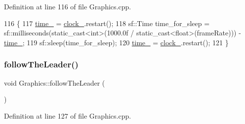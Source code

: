 Definition at line 116 of file Graphics.\+cpp.


\begin{DoxyCode}
116                                                           \{
117     \hyperlink{classGraphics_ab2983b7d90351c0f7b824ac6f887fd6d}{time\_} = \hyperlink{classGraphics_ad9850d50fe5792666c8aea88f39ba99c}{clock\_}.restart();
118     sf::Time time\_for\_sleep = sf::milliseconds(static\_cast<int>(1000.0f / static\_cast<float>(frameRate))) -
       \hyperlink{classGraphics_ab2983b7d90351c0f7b824ac6f887fd6d}{time\_};
119     sf::sleep(time\_for\_sleep);
120     \hyperlink{classGraphics_ab2983b7d90351c0f7b824ac6f887fd6d}{time\_} = \hyperlink{classGraphics_ad9850d50fe5792666c8aea88f39ba99c}{clock\_}.restart();
121 \}
\end{DoxyCode}
\mbox{\label{classGraphics_ad3718f2541f28115865058823113f5cd}} 
\subsubsection{\texorpdfstring{follow\+The\+Leader()}{followTheLeader()}}
{\footnotesize\ttfamily void Graphics\+::follow\+The\+Leader (\begin{DoxyParamCaption}{ }\end{DoxyParamCaption})\hspace{0.3cm}{\ttfamily [private]}}



Definition at line 127 of file Graphics.\+cpp.


